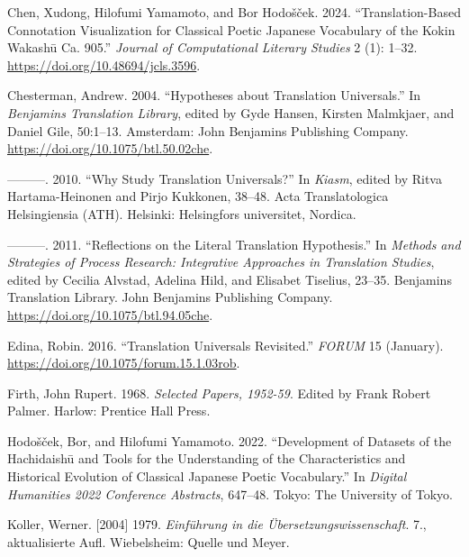 \documentclass[
  letterpaper,
  DIV=11,
  numbers=noendperiod]{scrartcl}
\newlength{\cslhangindent}
\newenvironment{CSLReferences}[2] %
 {\begin{list}{}{%
  \setlength{\itemindent}{0pt}
  \setlength{\leftmargin}{0pt}
  \setlength{\parsep}{0pt}
  \ifodd #1
   \setlength{\leftmargin}{\cslhangindent}
   \setlength{\itemindent}{-1\cslhangindent}
  \fi
  \setlength{\itemsep}{#2\baselineskip}}}
 {\end{list}}
\begin{document}
\begin{CSLReferences}{1}{0}
Chen, Xudong, Hilofumi Yamamoto, and Bor Hodošček. 2024.
{``Translation-Based Connotation Visualization for Classical Poetic
{Japanese} Vocabulary of the {Kokin Wakash{ū}} Ca. 905.''} \emph{Journal
of Computational Literary Studies} 2 (1): 1--32.
\url{https://doi.org/10.48694/jcls.3596}.

Chesterman, Andrew. 2004. {``Hypotheses about Translation Universals.''}
In \emph{Benjamins {Translation Library}}, edited by Gyde Hansen,
Kirsten Malmkjaer, and Daniel Gile, 50:1--13. Amsterdam: John Benjamins
Publishing Company. \url{https://doi.org/10.1075/btl.50.02che}.

---------. 2010. {``Why Study Translation Universals?''} In
\emph{Kiasm}, edited by Ritva Hartama-Heinonen and Pirjo Kukkonen,
38--48. Acta {Translatologica Helsingiensia} ({ATH}). Helsinki:
Helsingfors universitet, Nordica.

---------. 2011. {``Reflections on the Literal Translation
Hypothesis.''} In \emph{Methods and {Strategies} of {Process Research}:
{Integrative} Approaches in {Translation Studies}}, edited by Cecilia
Alvstad, Adelina Hild, and Elisabet Tiselius, 23--35. Benjamins
{Translation Library}. John Benjamins Publishing Company.
\url{https://doi.org/10.1075/btl.94.05che}.

Edina, Robin. 2016. {``Translation {Universals Revisited}.''}
\emph{FORUM} 15 (January).
\url{https://doi.org/10.1075/forum.15.1.03rob}.

Firth, John Rupert. 1968. \emph{{Selected Papers, 1952-59}}. Edited by
Frank Robert Palmer. Harlow: Prentice Hall Press.

Hodošček, Bor, and Hilofumi Yamamoto. 2022. {``Development of Datasets
of the {Hachidaish{ū}} and Tools for the Understanding of the
Characteristics and Historical Evolution of Classical {Japanese} Poetic
Vocabulary.''} In \emph{Digital {Humanities} 2022 {Conference
Abstracts}}, 647--48. Tokyo: The University of Tokyo.

Koller, Werner. {[}2004{]} 1979. \emph{{Einf{ü}hrung in die
{Ü}bersetzungswissenschaft}}. 7., aktualisierte Aufl. Wiebelsheim:
Quelle und Meyer.


\end{CSLReferences}
\end{document}
